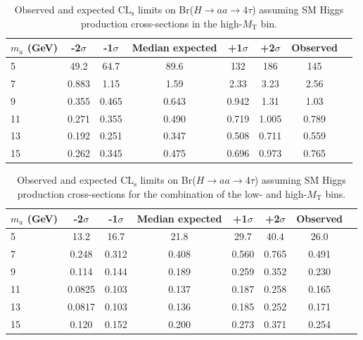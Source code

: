 \begin{table}
\begin{center}
  \caption{Observed and expected $\text{CL}_{\text{s}}$ limits on Br($H\rightarrow$$aa\rightarrow4\tau$) assuming SM Higgs production cross-sections in the high-$M_{\text{T}}$ bin.}
\singlespacing
\begin{tabular}{|m{3cm}|c|c|c|c|c|c|c|}
  \hline
  $m_{a}$ (GeV) & -2$\sigma$ & -1$\sigma$ & Median expected & +1$\sigma$ & +2$\sigma$ & Observed \\
  \hline
  \hline
  5 & 49.2 & 64.7 & 89.6 & 132 & 186 & 145 \\
  \hline
  7 & 0.883 & 1.15 & 1.59 & 2.33 & 3.23 & 2.56 \\
  \hline
  9 & 0.355 & 0.465 & 0.643 & 0.942 & 1.31 & 1.03 \\
  \hline
  11 & 0.271 & 0.355 & 0.490 & 0.719 & 1.005 & 0.789 \\
  \hline
  13 & 0.192 & 0.251 & 0.347 & 0.508 & 0.711 & 0.559 \\
  \hline
  15 & 0.262 & 0.345 & 0.475 & 0.696 & 0.973 & 0.765 \\
  \hline
  \end{tabular}%
\label{tab:CLs-limits-highMT}
\end{center}
\end{table}

\begin{table}
\begin{center}
  \caption{Observed and expected $\text{CL}_{\text{s}}$ limits on Br($H\rightarrow$$aa\rightarrow4\tau$) assuming SM Higgs production cross-sections for the combination of the low- and high-$M_{\text{T}}$ bins.}
\singlespacing
\begin{tabular}{|m{3cm}|c|c|c|c|c|c|c|}
  \hline
  $m_{a}$ (GeV) & -2$\sigma$ & -1$\sigma$ & Median expected & +1$\sigma$ & +2$\sigma$ & Observed \\
  \hline
  \hline
  5 & 13.2 & 16.7 & 21.8 & 29.7 & 40.4 & 26.0 \\
  \hline
  7 & 0.248 & 0.312 & 0.408 & 0.560 & 0.765 & 0.491 \\
  \hline
  9 & 0.114 & 0.144 & 0.189 & 0.259 & 0.352 & 0.230 \\
  \hline
  11 & 0.0825 & 0.103 & 0.137 & 0.187 & 0.258 & 0.165 \\
  \hline
  13 & 0.0817 & 0.103 & 0.136 & 0.185 & 0.252 & 0.171 \\
  \hline
  15 & 0.120 & 0.152 & 0.200 & 0.273 & 0.371 & 0.254 \\
  \hline
  \end{tabular}%
\label{tab:CLs-limits}
\end{center}
\end{table}